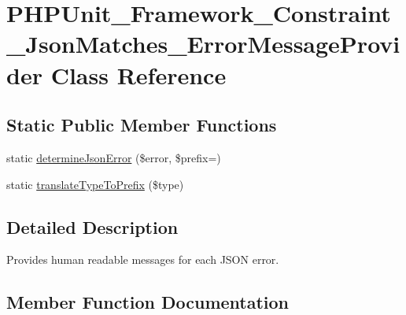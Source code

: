 \hypertarget{class_p_h_p_unit___framework___constraint___json_matches___error_message_provider}{}\section{P\+H\+P\+Unit\+\_\+\+Framework\+\_\+\+Constraint\+\_\+\+Json\+Matches\+\_\+\+Error\+Message\+Provider Class Reference}
\label{class_p_h_p_unit___framework___constraint___json_matches___error_message_provider}
\subsection*{Static Public Member Functions}
\begin{DoxyCompactItemize}
\item 
static \mbox{\hyperlink{class_p_h_p_unit___framework___constraint___json_matches___error_message_provider_a8cbb9231c8b8c8c3978e127f8e9ece62}{determine\+Json\+Error}} (\$error, \$prefix=\textquotesingle{}\textquotesingle{})
\item 
static \mbox{\hyperlink{class_p_h_p_unit___framework___constraint___json_matches___error_message_provider_a2c990b1169ffcac2cb13d0cda8fb559c}{translate\+Type\+To\+Prefix}} (\$type)
\end{DoxyCompactItemize}


\subsection{Detailed Description}
Provides human readable messages for each J\+S\+ON error. 

\subsection{Member Function Documentation}
\mbox{\label{class_p_h_p_unit___framework___constraint___json_matches___error_message_provider_a8cbb9231c8b8c8c3978e127f8e9ece62}} 
